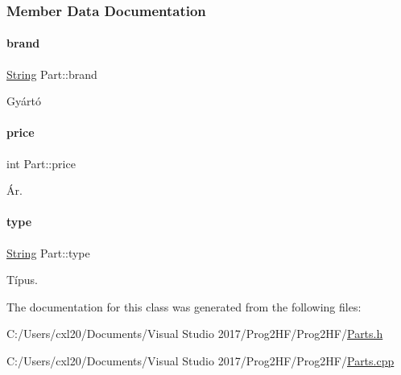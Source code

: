 \subsubsection{Member Data Documentation}
\mbox{\label{class_part_ae06f2fdeb7fbbdb229a7aca151f3e341}} 
\paragraph{\texorpdfstring{brand}{brand}}
{\footnotesize\ttfamily \mbox{\hyperlink{class_string}{String}} Part\+::brand\hspace{0.3cm}{\ttfamily [protected]}}



Gyártó 

\mbox{\label{class_part_a8e71223aed1da95a974f33d8d6c91bb1}} 
\paragraph{\texorpdfstring{price}{price}}
{\footnotesize\ttfamily int Part\+::price\hspace{0.3cm}{\ttfamily [protected]}}



Ár. 

\mbox{\label{class_part_a101dbcc5c4b21564df7414c7eb0eae88}} 
\paragraph{\texorpdfstring{type}{type}}
{\footnotesize\ttfamily \mbox{\hyperlink{class_string}{String}} Part\+::type\hspace{0.3cm}{\ttfamily [protected]}}



Típus. 



The documentation for this class was generated from the following files\+:\begin{DoxyCompactItemize}
\item 
C\+:/\+Users/cxl20/\+Documents/\+Visual Studio 2017/\+Prog2\+H\+F/\+Prog2\+H\+F/\mbox{\hyperlink{_parts_8h}{Parts.\+h}}\item 
C\+:/\+Users/cxl20/\+Documents/\+Visual Studio 2017/\+Prog2\+H\+F/\+Prog2\+H\+F/\mbox{\hyperlink{_parts_8cpp}{Parts.\+cpp}}\end{DoxyCompactItemize}
